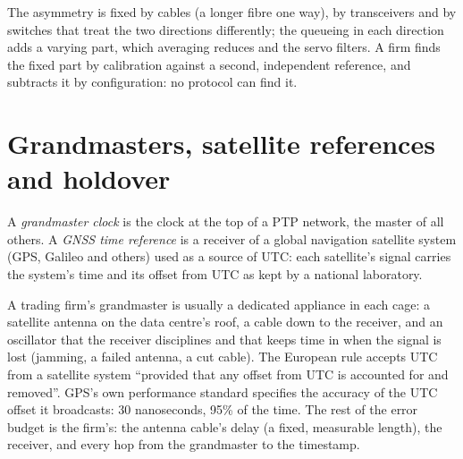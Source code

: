 The asymmetry is fixed by cables (a longer fibre one way), by transceivers and by switches that treat the two directions
differently; the queueing in each direction adds a varying part, which averaging reduces and the servo filters. A firm finds the fixed
part by calibration against a second, independent reference, and subtracts it by configuration: no protocol can find it.

\label{lst:nw:time-synchronisation:exchange}

\section{Grandmasters, satellite references and holdover}

\begin{definition}\label{def:nw:time-synchronisation:gm}
A \emph{grandmaster clock} is the clock at the top of a PTP network, the master of all others. A \emph{GNSS
time reference} is a receiver of a global navigation satellite system (GPS, Galileo and others) used as a
source of UTC: each satellite's signal carries the system's time and its offset from UTC as kept by a national laboratory.
\end{definition}

A trading firm's grandmaster is usually a dedicated appliance in each cage: a satellite antenna on the data centre's roof, a cable
down to the receiver, and an oscillator that the receiver disciplines and that keeps time in  when the signal is lost
(jamming, a failed antenna, a cut cable). The European rule accepts UTC from a satellite system ``provided that any offset from UTC is
accounted for and removed''. GPS's own performance standard specifies the accuracy of the UTC offset it broadcasts: 30 nanoseconds,
95\% of the time. The rest of the error budget is the firm's: the antenna cable's delay (a fixed, measurable length), the receiver, and
every hop from the grandmaster to the timestamp.

